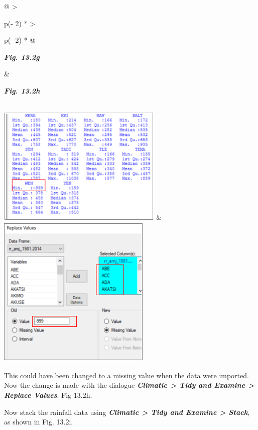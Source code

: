 \documentclass[
  letterpaper,
  DIV=11,
  numbers=noendperiod]{scrreprt}
\begin{document}
\begin{longtable}[]{@{}
  >{\raggedright\arraybackslash}p{(\columnwidth - 2\tabcolsep) * }
  >{\raggedright\arraybackslash}p{(\columnwidth - 2\tabcolsep) * }@{}}
\toprule\noalign{}
\begin{minipage}[b]{\linewidth}\raggedright
\textbf{\emph{Fig. 13.2g}}
\end{minipage} & \begin{minipage}[b]{\linewidth}\raggedright
\textbf{\emph{Fig. 13.2h}}
\end{minipage} \\
\midrule\noalign{}
\endhead
\bottomrule\noalign{}
\endlastfoot
\includegraphics[width=3.11013in,height=2.21722in]{figures/Fig13.2g.png}
&
\includegraphics[width=2.87085in,height=2.88154in]{figures/Fig13.2h.png} \\
\end{longtable}

This could have been changed to a missing value when the data were
imported. Now the change is made with the dialogue
\textbf{\emph{Climatic \textgreater{} Tidy and Examine \textgreater{}
Replace Values}}. Fig 13.2h.

Now stack the rainfall data using \textbf{\emph{Climatic \textgreater{}
Tidy and Examine \textgreater{} Stack}}, as shown in Fig. 13.2i.
\end{document}
